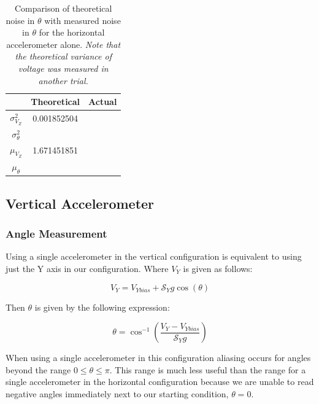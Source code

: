 \documentclass{article}
\theoremstyle{plain}
\theoremstyle{definition}
\theoremstyle{remark}
\newcommand{\Sens}{\mathcal{S}}
\begin{document}
\begin{table}
\begin{center}
    \begin{tabular}{|c|c|c|}
        \hline
        ~                   & Theoretical  & Actual \\ \hline
        $\sigma^2_{V_{Z}}$    & 0.001852504            & ~      \\ 
        $\sigma^2_{\theta}$ & ~            & ~      \\ 
        $\mu_{V_{Z}}$       & 1.671451851            & ~      \\ 
        $\mu_{\theta}$      & ~            & ~      \\
        \hline
    \end{tabular}
\label{Noise_horizontal_T}
\caption{Comparison of theoretical noise in $\theta$ with measured noise in $\theta$ for the horizontal accelerometer alone. \emph{Note that the theoretical variance of voltage was measured in another trial.}}
\end{center}
\end{table}

\subsection{Vertical Accelerometer}

\subsubsection{Angle Measurement}

Using a single accelerometer in the vertical configuration is equivalent to using just the Y axis in our configuration.  Where $V_{Y}$ is given as follows:

$$ V_{Y} = V_{Ybias} + \Sens_{Y} g \cos(\theta) $$

Then $\theta$ is given by the following expression:

\begin{equation}
\theta = \cos^{-1}\left( \frac{V_{Y} - V_{Ybias}}{\Sens_{Y} g}\right)
\label{verticalEQ}
\end{equation}

When using a single accelerometer in this configuration aliasing occurs for angles beyond the range $0 \leq \theta \leq \pi$.  This range is much less useful than the range for a single accelerometer in the horizontal configuration because we are unable to read negative angles immediately next to our starting condition, $\theta = 0$. 
\end{document}
